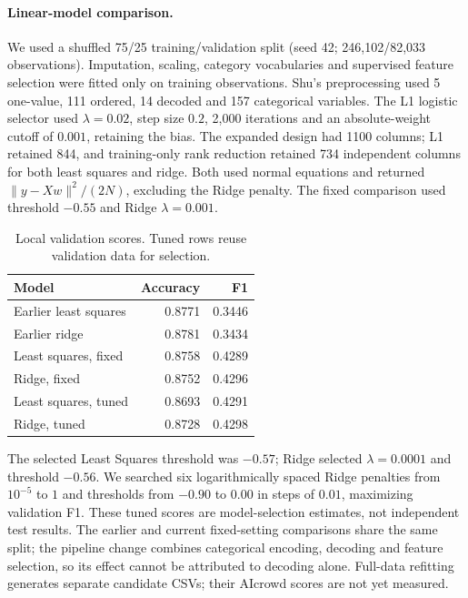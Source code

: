 \paragraph{Linear-model comparison.}
We used a shuffled 75/25 training/validation split (seed 42;
246,102/82,033 observations). Imputation, scaling, category vocabularies and
supervised feature selection were fitted only on training observations.
Shu's preprocessing used 5 one-value, 111 ordered, 14 decoded and 157 categorical
variables. The L1 logistic selector used $\lambda=0.02$, step size $0.2$,
2,000 iterations and an absolute-weight cutoff of $0.001$, retaining the bias.
The expanded design had 1100 columns; L1 retained 844,
and training-only rank reduction retained 734 independent columns
for both least squares and ridge. Both used normal equations and returned
$\|y-Xw\|^2/(2N)$, excluding the Ridge penalty. The fixed comparison used
threshold $-0.55$ and Ridge $\lambda=0.001$.

\begin{table}[t]
\centering
\caption{Local validation scores. Tuned rows reuse validation data for selection.}
\begin{tabular}{lrr}
\toprule
Model & Accuracy & F1 \\
\midrule
Earlier least squares & 0.8771 & 0.3446 \\
Earlier ridge & 0.8781 & 0.3434 \\
Least squares, fixed & 0.8758 & 0.4289 \\
Ridge, fixed & 0.8752 & 0.4296 \\
Least squares, tuned & 0.8693 & 0.4291 \\
Ridge, tuned & 0.8728 & 0.4298 \\
\bottomrule
\end{tabular}
\end{table}

The selected Least Squares threshold was $-0.57$;
Ridge selected $\lambda=0.0001$ and threshold $-0.56$.
We searched six logarithmically spaced Ridge penalties from $10^{-5}$ to $1$
and thresholds from $-0.90$ to $0.00$ in steps of $0.01$, maximizing validation F1.
These tuned scores are model-selection estimates, not independent test results.
The earlier and current fixed-setting comparisons share the same split; the
pipeline change combines categorical encoding, decoding and feature selection,
so its effect cannot be attributed to decoding alone. Full-data refitting
generates separate candidate CSVs; their AIcrowd scores are not yet measured.
